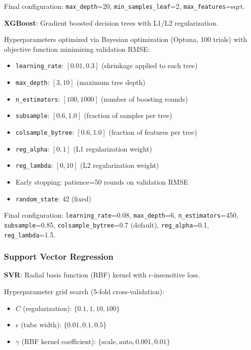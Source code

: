 Final configuration: \texttt{max\_depth}=20, \texttt{min\_samples\_leaf}=2, \texttt{max\_features}=sqrt.

\textbf{XGBoost}: Gradient boosted decision trees with L1/L2 regularization.

Hyperparameters optimized via Bayesian optimization (Optuna, 100 trials) with objective function minimizing validation RMSE:
\begin{itemize}
    \item \texttt{learning\_rate}: $[0.01, 0.3]$ (shrinkage applied to each tree)
    \item \texttt{max\_depth}: $[3, 10]$ (maximum tree depth)
    \item \texttt{n\_estimators}: $[100, 1000]$ (number of boosting rounds)
    \item \texttt{subsample}: $[0.6, 1.0]$ (fraction of samples per tree)
    \item \texttt{colsample\_bytree}: $[0.6, 1.0]$ (fraction of features per tree)
    \item \texttt{reg\_alpha}: $[0, 1]$ (L1 regularization weight)
    \item \texttt{reg\_lambda}: $[0, 10]$ (L2 regularization weight)
    \item Early stopping: patience=50 rounds on validation RMSE
    \item \texttt{random\_state}: 42 (fixed)
\end{itemize}

Final configuration: \texttt{learning\_rate}=0.08, \texttt{max\_depth}=6, \texttt{n\_estimators}=450, \texttt{subsample}=0.85, \texttt{colsample\_bytree}=0.7 (default), \texttt{reg\_alpha}=0.1, \texttt{reg\_lambda}=1.5.

\subsubsection*{Support Vector Regression}

\textbf{SVR}: Radial basis function (RBF) kernel with $\epsilon$-insensitive loss.

Hyperparameter grid search (5-fold cross-validation):
\begin{itemize}
    \item $C$ (regularization): $\{0.1, 1, 10, 100\}$
    \item $\epsilon$ (tube width): $\{0.01, 0.1, 0.5\}$
    \item $\gamma$ (RBF kernel coefficient): $\{\text{scale}, \text{auto}, 0.001, 0.01\}$
\end{itemize}

